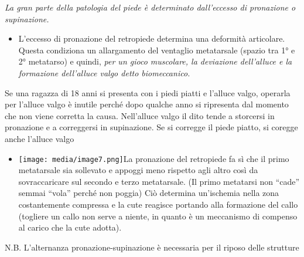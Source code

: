 \documentclass[]{article}
\begin{document}
\emph{La gran parte della patologia del piede è determinato dall'eccesso
di pronazione o supinazione.}

\begin{itemize}
\item
  L'eccesso di pronazione del retropiede determina una deformità
  articolare. Questa condiziona un allargamento del ventaglio
  metatarsale (spazio tra 1° e 2° metatarso) e quindi, \emph{per un
  gioco muscolare, la deviazione dell'alluce e la formazione dell'alluce
  \emph{valgo} detto biomeccanico.}
\end{itemize}

Se una ragazza di 18 anni si presenta con i piedi piatti e l'alluce
valgo, operarla per l'alluce valgo è inutile perché dopo qualche anno si
ripresenta dal momento che non viene corretta la causa. Nell'alluce
valgo il dito tende a storcersi in pronazione e a correggersi in
supinazione. Se si corregge il piede piatto, si coregge anche l'alluce
valgo

\begin{itemize}
\item
  \texttt{[image: media/image7.png]}La
  pronazione del retropiede fa sì che il primo metatarsale sia sollevato
  e appoggi meno rispetto agli altro così da sovraccaricare sul secondo
  e terzo metatarsale. (Il primo metatarsi non ``cade'' semmai ``vola''
  perché non poggia) Ciò determina un'ischemia nella zona costantemente
  compressa e la cute reagisce portando alla formazione del callo
  (togliere un callo non serve a niente, in quanto è un meccanismo di
  compenso al carico che la cute adotta).
\end{itemize}

N.B. L'alternanza pronazione-supinazione è necessaria per il riposo
delle strutture
\end{document}
